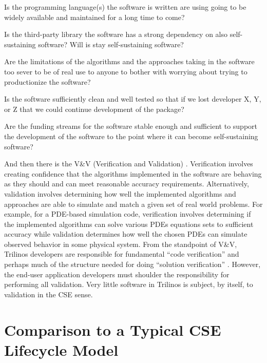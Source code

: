 \documentclass[11pt]{SANDreport}
\begin{document}
\begin{compactitem}

{}\item Is the programming language(s) the software is written are
using going to be widely available and maintained for a long time to
come?

{}\item Is the third-party library the software has a strong
dependency on also self-sustaining software?  Will is stay
self-sustaining software?

{}\item Are the limitations of the algorithms and the approaches
taking in the software too sever to be of real use to anyone to bother
with worrying about trying to productionize the software?

{}\item Is the software sufficiently clean and well tested so that if
we lost developer X, Y, or Z that we could continue development of the
package?

{}\item Are the funding streams for the software stable enough and
sufficient to support the development of the software to the point
where it can become self-sustaining software?

\end{compactitem}

And then there is the V\&V (Verification and Validation)
{}\cite{SEVVIntersections05}.  Verification involves creating
confidence that the algorithms implemented in the software are
behaving as they should and can meet reasonable accuracy requirements.
Alternatively, validation involves determining how well the
implemented algorithms and approaches are able to simulate and match a
given set of real world problems.  For example, for a PDE-based
simulation code, verification involves determining if the implemented
algorithms can solve various PDEs equations sets to sufficient
accuracy while validation determines how well the chosen PDEs can
simulate observed behavior in some physical system.  From the
standpoint of V\&V, Trilinos developers are responsible for
fundamental ``code verification'' and perhaps much of the structure
needed for doing ``solution verification''
{}\cite{SEVVIntersections05}.  However, the end-user application
developers must shoulder the responsibility for performing all
validation.  Very little software in Trilinos is subject, by itself,
to validation in the CSE sense.


%
\section{Comparison to a Typical CSE Lifecycle Model}
\label{sec:compare_with_typical_CSE_model}
%
\end{document}
